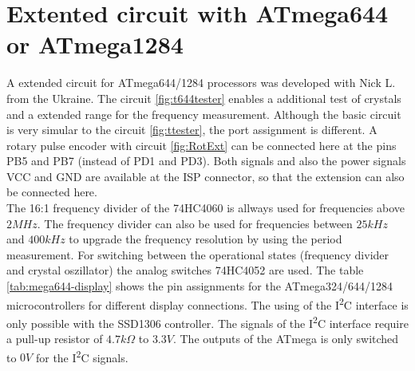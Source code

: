 \section{Extented circuit with ATmega644 or ATmega1284}

A extended circuit for ATmega644/1284 processors was developed with Nick L. from the Ukraine.
The circuit \ref{fig:t644tester} enables a additional test of crystals and a extended range
for the frequency measurement.
Although the basic circuit is very simular to the circuit \ref{fig:ttester}, the
port assignment is different.
A rotary pulse encoder with circuit \ref{fig:RotExt} can be connected here at the pins PB5 and PB7 (instead of PD1 and PD3).
Both signals and also the power signals VCC and GND are available at the ISP connector,
so that the extension can also be connected here.\\

The 16:1 frequency divider of the 74HC4060 is allways used for frequencies above \(2MHz\).
The frequency divider can also be used for frequencies between \(25kHz\) and \(400kHz\) to
upgrade the frequency resolution by using the period measurement.
For switching between the operational states (frequency divider and crystal oszillator)
the analog switches 74HC4052 are used.
The table \ref{tab:mega644-display} shows the pin assignments for the ATmega324/644/1284
microcontrollers for different display connections.
The using of the I\textsuperscript{2}C interface is only possible with the SSD1306 controller.
The signals of the I\textsuperscript{2}C interface require a pull-up resistor of \(4.7k\Omega\) to \(3.3V\).
The outputs of the ATmega is only switched to \(0V\) for the I\textsuperscript{2}C signals.


